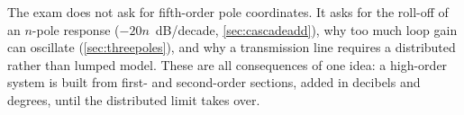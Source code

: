 \begin{exambox}
The exam does not ask for fifth-order pole coordinates. It asks for the roll-off of an
\(n\)-pole response (\(-20n\)~dB/decade, \cref{sec:cascadeadd}), why too much loop
gain can oscillate (\cref{sec:threepoles}), and why a transmission line requires a
distributed rather than lumped model. These are all consequences of one idea: a
high-order system is built from first- and second-order sections, added in decibels
and degrees, until the distributed limit takes over.
\end{exambox}
